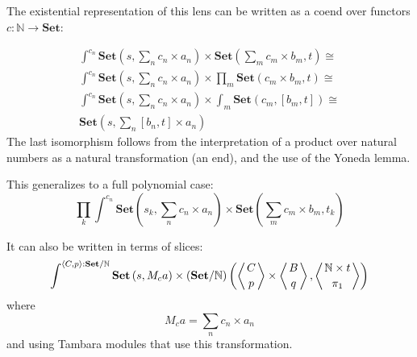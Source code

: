 \documentclass[11pt]{amsart}
\begin{document}
 
 The existential representation of this lens can be written as a coend over functors $c \colon \mathbb{N} \to \mathbf{Set}$:
 
\begin{align*}
\int^{c_n}  \mathbf{Set} (s, \sum_n c_n \times a_n) \times  \mathbf{Set} (\sum_m c_m \times b_m, t) \cong
\\
\int^{c_n}  \mathbf{Set} (s, \sum_n c_n \times a_n) \times  \prod_m \mathbf{Set} ( c_m \times b_m, t) \cong
\\
\int^{c_n}  \mathbf{Set} (s, \sum_n c_n \times a_n) \times  \int_m \mathbf{Set} ( c_m, [b_m, t]) \cong
\\ 
\mathbf{Set} (s, \sum_n [b_n, t] \times a_n)
\end{align*}
The last isomorphism follows from the interpretation of a product over natural numbers as a natural transformation (an end), and the use of the Yoneda lemma.

This generalizes to a full polynomial case:
\[ \prod_k \int^{c_n}  \mathbf{Set} (s_k, \sum_n c_n \times a_n) \times  \mathbf{Set} (\sum_m c_m \times b_m, t_k) \]


It can also be written in terms of slices:
\[ \int^{\langle C, p \rangle : \mathbf{Set}/\mathbb{N}} \mathbf{Set} 
\left(s,  M_c a \right)  
  \times (\mathbf{Set}/\mathbb{N})\left( \left \langle {C \atop p} \right \rangle 
  \times \left \langle {B \atop q} \right \rangle, \left \langle {\mathbb{N} \times t \atop \pi_1} \right \rangle \right) \]
 where 
 \[ M_c a = \sum_n c_n \times a_n \]
and using Tambara modules that use this transformation.
\end{document}
